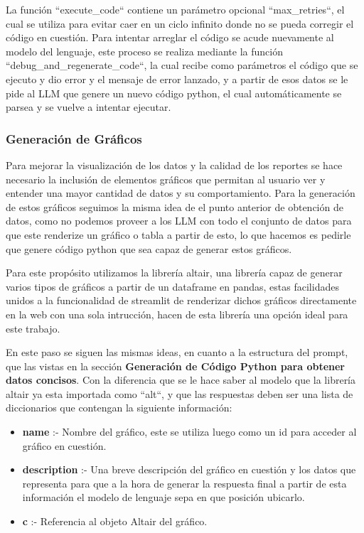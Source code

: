La función ``execute\_code`` contiene un parámetro opcional ``max\_retries``, el cual se utiliza para evitar caer en un ciclo infinito donde no se pueda corregir el código en cuestión. Para intentar arreglar el código se acude nuevamente al modelo del lenguaje, este proceso se realiza mediante la función ``debug\_and\_regenerate\_code``, la cual recibe como parámetros el código que se ejecuto y dio error y el mensaje de error lanzado, y a partir de esos datos se le pide al LLM que genere un nuevo código python, el cual automáticamente se parsea y se vuelve a intentar ejecutar.

\subsubsection{Generación de Gráficos}

Para mejorar la visualización de los datos y la calidad de los reportes se hace necesario la inclusión de elementos gráficos que permitan al usuario ver y entender una mayor cantidad de datos y su comportamiento. Para la generación de estos gráficos seguimos la misma idea de el punto anterior de obtención de datos, como no podemos proveer a los LLM con todo el conjunto de datos para que este renderize un gráfico o tabla a partir de esto, lo que hacemos es pedirle que genere código python que sea capaz de generar estos gráficos.

Para este propósito utilizamos la librería altair\cite{altair}, una librería capaz de generar varios tipos de gráficos a partir de un dataframe en pandas, estas facilidades unidos a la funcionalidad de streamlit de renderizar dichos gráficos directamente en la web con una sola intrucción, hacen de esta librería una opción ideal para este trabajo.

En este paso se siguen las mismas ideas, en cuanto a la estructura del prompt, que las vistas en la sección \textbf{Generación de Código Python para obtener datos concisos}. Con la diferencia que se le hace saber al modelo que la librería altair ya esta importada como ``alt``, y que las respuestas deben ser una lista de diccionarios que contengan la siguiente información:

\begin{itemize}
	\item \textbf{name} :- Nombre del gráfico, este se utiliza luego como un id para acceder al gráfico en cuestión.
	\item \textbf{description} :- Una breve descripción del gráfico en cuestión y los datos que representa para que a la hora de generar la respuesta final a partir de esta información el modelo de lenguaje sepa en que posición ubicarlo.
	\item \textbf{c} :- Referencia al objeto Altair del gráfico.
\end{itemize}

